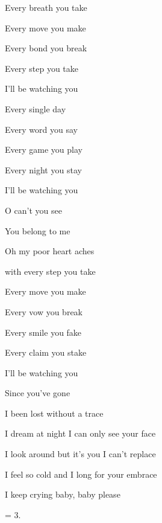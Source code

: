 

\zs
Every breath you take

Every move you make

Every bond you break

Every step you take

I'll be watching you
\ks

\zs
Every single day

Every word you say

Every game you play

Every night you stay

I'll be watching you
\ks

\zr
O can't you see

You belong to me

Oh my poor heart aches 

with every step you take
\kr

\zs
Every move you make

Every vow you break

Every smile you fake

Every claim you stake

I'll be watching you
\ks

\zs
Since you've gone 

I been lost without a trace

I dream at night I can only see your face

I look around but it's you I can't replace

I feel so cold and I long for your embrace

I keep crying baby, baby please
\ks

\zr
\kr

\zs
= 3.
\ks


\kp
